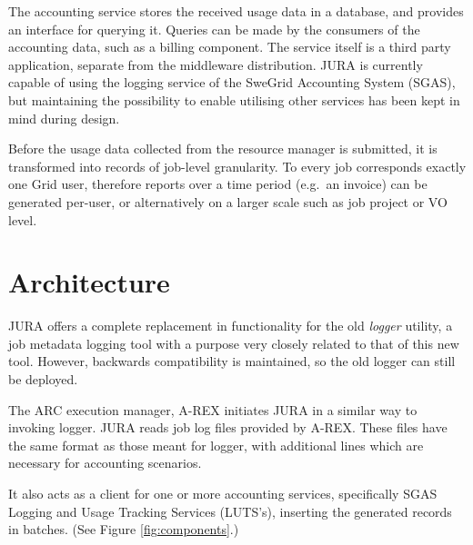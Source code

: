 \documentclass{article}                            %
\begin{document}
The accounting service stores the received usage data in a database,
and provides an interface for querying it. Queries can be made by the
consumers of the accounting data, such as a billing component. The
service itself is a third party application, separate from the
middleware distribution. JURA is currently capable of using the
logging service of the SweGrid Accounting System (SGAS)\cite{sgas},
but maintaining the possibility to enable utilising other services has
been kept in mind during design.

Before the usage data collected from the resource manager is
submitted, it is transformed into records of job-level granularity. To
every job corresponds exactly one Grid user, therefore reports over a
time period (e.g.~an invoice) can be generated per-user, or
alternatively on a larger scale such as job project or VO level.

\section{Architecture}

\begin{figure}[ht]
\end{figure}

JURA offers a complete replacement in functionality for the old
\textit{logger} utility\cite{logger}, a job metadata logging tool with
a purpose very closely related to that of this new tool. However,
backwards compatibility is maintained, so the old logger can still be
deployed.

The ARC execution manager, A-REX\cite{arex} initiates JURA in a
similar way to invoking logger. JURA reads job log files provided by
A-REX. These files have the same format as those meant for logger,
with additional lines which are necessary for accounting scenarios.

It also acts as a client for one or more accounting services,
specifically SGAS Logging and Usage Tracking Services (LUTS's),
inserting the generated records in batches. (See Figure
\ref{fig:components}.)
\end{document}
